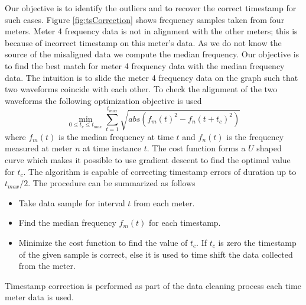 	Our objective is to identify the outliers and to recover the correct timestamp for such cases. Figure \ref{fig:tsCorrection} shows frequency samples taken from four meters. Meter 4 frequency data is not in alignment with the other meters; this is because of incorrect timestamp on this meter's data. As we do not know the source of  the misaligned data we compute the median frequency. Our objective is to find the best match for  meter 4 frequency data with the median frequency data. The intuition is to slide the meter 4 frequency data on the graph such that two waveforms coincide with each other. To check the alignment of the two waveforms the following optimization objective is used
	\begin{equation}
		\min_{0 \leq t_c \leq t_{max}}  \sum_{t=1}^{t_{max}}  \sqrt{abs(f_m(t)^2 - f_n(t + t_c)^2)}
	\end{equation}where $f_m(t)$ is the median frequency at time $t$ and $f_n(t)$ is the frequency measured at meter $n$ at time instance $t$. The cost function forms a $U$ shaped curve which makes it possible to use gradient descent to find the optimal value for $t_c$.
The algorithm is capable of correcting timestamp errors of duration up to $t_{max} / 2$.
The procedure can be summarized as follows
	\begin{itemize}
		\item Take data sample for interval $t$ from each meter.
		\item Find the median frequency $f_m(t)$ for each timestamp.
		\item Minimize the cost function to find the value of $t_c$. If $t_c$ is zero the timestamp of the given sample is correct,  else it is used to time shift the data collected from the meter.
	\end{itemize}

Timestamp correction is performed as part of the data cleaning process each time meter data is used.


